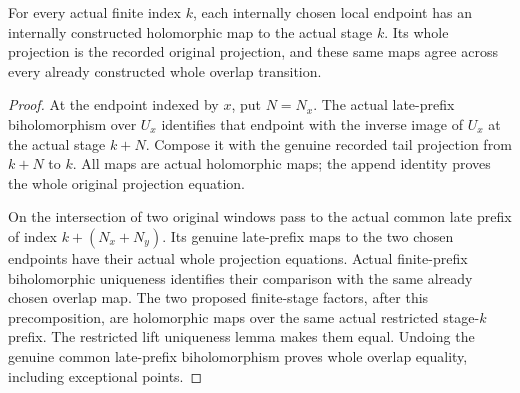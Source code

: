\begin{theorem}
\label{hir:actual-locally-finite-history-local-finite-stage-factors}
\leanok
For every actual finite index $k$, each internally chosen local endpoint
has an internally constructed holomorphic map to the actual stage $k$.
Its whole projection is the recorded original projection, and these same
maps agree across every already constructed whole overlap transition.
\end{theorem}
\begin{proof}
At the endpoint indexed by $x$, put $N=N_x$. The actual late-prefix
biholomorphism over $U_x$ identifies that endpoint with the inverse image of
$U_x$ at the actual stage $k+N$. Compose it with the genuine recorded tail
projection from $k+N$ to $k$. All maps are actual holomorphic maps; the
append identity proves the whole original projection equation.

On the intersection of two original windows pass to the actual common
late prefix of index $k+(N_x+N_y)$. Its genuine late-prefix maps to the two
chosen endpoints have their actual whole projection equations. Actual
finite-prefix biholomorphic uniqueness identifies their comparison with
the same already chosen overlap map. The two proposed finite-stage
factors, after this precomposition, are holomorphic maps over the same
actual restricted stage-$k$ prefix. The restricted lift uniqueness lemma
makes them equal. Undoing the genuine common late-prefix biholomorphism
proves whole overlap equality, including exceptional points.
\end{proof}

